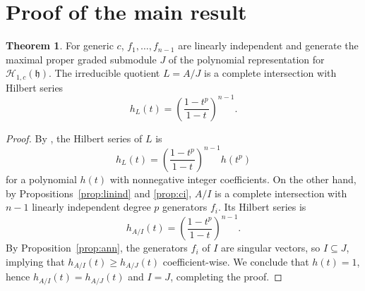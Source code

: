 \documentclass{amsart}
\numberwithin{equation}{section}
\theoremstyle{definition}
\newtheorem{theorem}{Theorem}[section]
\newcommand{\h}{\mathfrak{h}}
\newcommand{\HH}{\mathcal{H}}
\begin{document}
\section{Proof of the main result}

\begin{theorem}\label{thm:main}
For generic $c$, $f_1, \ldots, f_{n-1}$ are linearly independent and generate the maximal proper graded submodule $J$ of the polynomial representation for $\HH_{1, c}(\h)$.  The irreducible quotient $L = A/J$ is a complete intersection with Hilbert series 
\[
h_L(t) = \left(\frac{1-t^p}{1-t}\right)^{n-1}.
\]
\end{theorem}
\begin{proof}
By \cite[Proposition 3.4]{BC1}, the Hilbert series of $L$ is 
\[
h_L(t) = \left(\frac{1-t^p}{1-t}\right)^{n-1}h(t^p)
\]
for a polynomial $h(t)$ with nonnegative integer coefficients.  On the other hand, by Propositions~\ref{prop:linind} and \ref{prop:ci}, $A/I$ is a complete intersection with $n-1$ linearly independent degree $p$ generators $f_i$. Its Hilbert series is
\[
h_{A/I}(t)=\left(\frac{1-t^p}{1-t}\right)^{n-1}.
\]
By Proposition~\ref{prop:ann}, the generators $f_i$ of $I$ are singular vectors, so $I \subseteq J$, implying that $h_{A/I}(t) \ge h_{A/J}(t)$ coefficient-wise.  We conclude that $h(t) = 1$, hence $h_{A/I}(t)=h_{A/J}(t)$ and $I=J$, completing the proof.
\end{proof}



\end{document}
